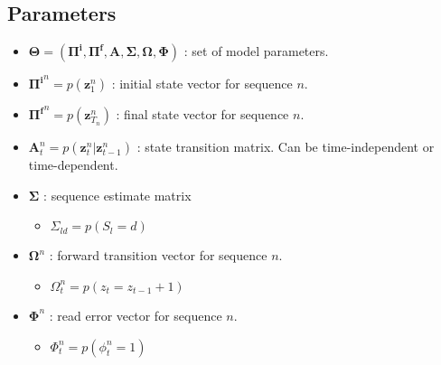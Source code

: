 \documentclass[reqno]{amsart}
\numberwithin{equation}{section}
\begin{document}
\subsection{Parameters}
\begin{itemize}
\item $\mathbf{\Theta} = (\mathbf{\Pi^i},\mathbf{\Pi^f},\mathbf{A},\mathbf{\Sigma},\mathbf{\Omega},\mathbf{\Phi})$ : set of model parameters.
\item $\mathbf{\Pi^i}^n = p(\mathbf{z}_1^n)$ : initial state vector for sequence $n$.
\item $\mathbf{\Pi^f}^n = p(\mathbf{z}_{T_n}^n)$ : final state vector for sequence $n$.
\item $\mathbf{A}_t^n = p(\mathbf{z}_{t}^n|\mathbf{z}_{t-1}^n)$ : state transition matrix. Can be time-independent or time-dependent.
\item $\mathbf{\Sigma}$ : sequence estimate matrix
\begin{itemize}
\item $\Sigma_{ld} = p(S_l=d)$
\end{itemize}
\item $\mathbf{\Omega}^n$ : forward transition vector for sequence $n$.
\begin{itemize}
\item $\Omega_t^n = p(z_t = z_{t-1} + 1)$
\end{itemize}
\item $\mathbf{\Phi}^n$ : read error vector for sequence $n$.
\begin{itemize}
\item $\Phi_t^n = p(\phi_t^n=1)$
\end{itemize}
\end{itemize}
\end{document}
